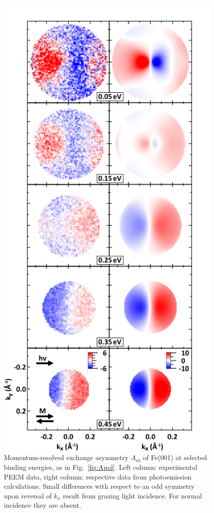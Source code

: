 \documentclass[prl,twocolumn,floatfix,superscriptaddress]{revtex4-2}
\begin{document}
\begin{figure}
    \centering
    \includegraphics[width = 0.7\columnwidth]{FePaperAex.pdf}
    \caption{Momentum-resolved exchange asymmetry $A_{\mathrm{ex}}$ of Fe(001) at selected binding energies, as in Fig.~\ref{fig:Apol}. Left column: experimental PEEM data, right column: respective data from  photoemission calculations. Small differences with respect to an odd symmetry upon reversal of $k_{x}$ result from grazing light incidence. For normal incidence they are absent.}
    \label{fig:Aex}
\end{figure}
\end{document}
